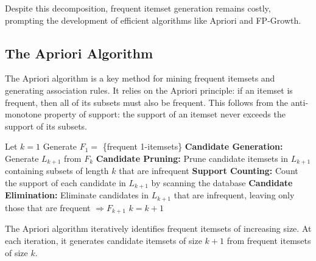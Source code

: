 Despite this decomposition, frequent itemset generation remains costly, prompting the development of efficient algorithms like Apriori and FP-Growth.

\subsection{The Apriori Algorithm}

The Apriori algorithm is a key method for mining frequent itemsets and generating association rules. It relies on the Apriori principle: if an itemset is frequent, then all of its subsets must also be frequent. This follows from the anti-monotone property of support: the support of an itemset never exceeds the support of its subsets.

\begin{algorithm}
\caption{Apriori Algorithm}
\begin{algorithmic}[1]
\State Let $k=1$
\State Generate $F_1 =$ \{frequent 1-itemsets\}
\Repeat
    \State \textbf{Candidate Generation:} Generate $L_{k+1}$ from $F_k$
    \State \textbf{Candidate Pruning:} Prune candidate itemsets in $L_{k+1}$ containing subsets of length $k$ that are infrequent
    \State \textbf{Support Counting:} Count the support of each candidate in $L_{k+1}$ by scanning the database
    \State \textbf{Candidate Elimination:} Eliminate candidates in $L_{k+1}$ that are infrequent, leaving only those that are frequent $\Rightarrow F_{k+1}$
    \State $k = k + 1$
\end{algorithmic}
\end{algorithm}

The Apriori algorithm iteratively identifies frequent itemsets of increasing size. At each iteration, it generates candidate itemsets of size $k+1$ from frequent itemsets of size $k$.

